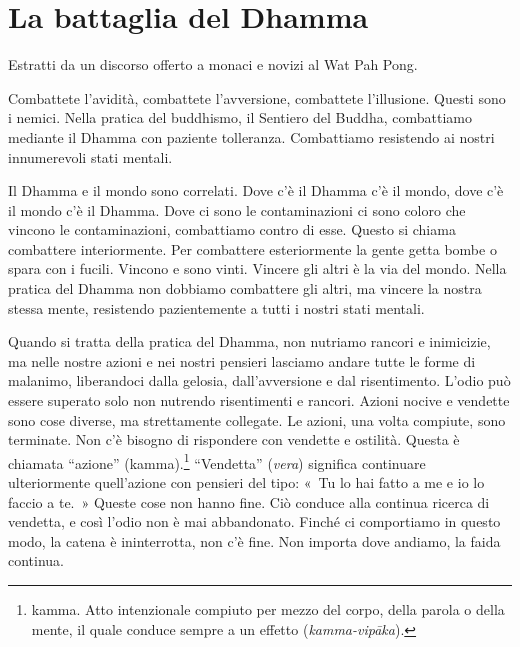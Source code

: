 \chapter{La battaglia del Dhamma}

\begin{openingQuote}
  \centering

  Estratti da un discorso offerto a monaci e novizi al Wat Pah Pong.
\end{openingQuote}

Combattete l'avidità, combattete l'avversione, combattete l'illusione.
Questi sono i nemici. Nella pratica del buddhismo, il Sentiero del
Buddha, combattiamo mediante il Dhamma con paziente tolleranza.
Combattiamo resistendo ai nostri innumerevoli stati mentali.

Il Dhamma e il mondo sono correlati. Dove c'è il Dhamma c'è il mondo,
dove c'è il mondo c'è il Dhamma. Dove ci sono le contaminazioni ci sono
coloro che vincono le contaminazioni, combattiamo contro di esse. Questo
si chiama combattere interiormente. Per combattere esteriormente la
gente getta bombe o spara con i fucili. Vincono e sono vinti. Vincere
gli altri è la via del mondo. Nella pratica del Dhamma non dobbiamo
combattere gli altri, ma vincere la nostra stessa mente, resistendo
pazientemente a tutti i nostri stati mentali.

Quando si tratta della pratica del Dhamma, non nutriamo rancori e
inimicizie, ma nelle nostre azioni e nei nostri pensieri lasciamo andare
tutte le forme di malanimo, liberandoci dalla gelosia, dall'avversione
e dal risentimento. L'odio può essere superato solo non nutrendo
risentimenti e rancori. Azioni nocive e vendette sono cose diverse, ma
strettamente collegate. Le azioni, una volta compiute, sono terminate.
Non c'è bisogno di rispondere con vendette e ostilità. Questa è chiamata
``azione'' (kamma).\footnote{kamma. Atto intenzionale
  compiuto per mezzo del corpo, della parola o della mente, il quale
  conduce sempre a un effetto (\emph{kamma-vipāka}).} ``Vendetta''
(\emph{vera}) significa continuare ulteriormente quell'azione con
pensieri del tipo: «~Tu lo hai fatto a me e io lo faccio a te.~» Queste
cose non hanno fine. Ciò conduce alla continua ricerca di vendetta, e
così l'odio non è mai abbandonato. Finché ci comportiamo in questo modo,
la catena è ininterrotta, non c'è fine. Non importa dove andiamo, la
faida continua.


